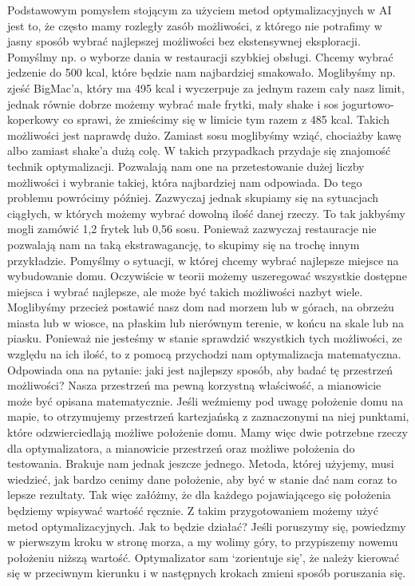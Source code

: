 Podstawowym pomysłem stojącym za użyciem metod optymalizacyjnych w AI jest to, że często mamy rozległy zasób możliwości, z którego nie potrafimy w jasny sposób wybrać najlepszej możliwości bez ekstensywnej eksploracji. Pomyślmy np. o wyborze dania w restauracji szybkiej obsługi. Chcemy wybrać jedzenie do 500 kcal, które będzie nam najbardziej smakowało. Moglibyśmy np. zjeść BigMac’a, który ma 495 kcal i wyczerpuje za jednym razem cały nasz limit, jednak równie dobrze możemy wybrać małe frytki, mały shake i sos jogurtowo-koperkowy co sprawi, że zmieścimy się w limicie tym razem z 485 kcal. Takich możliwości jest naprawdę dużo. Zamiast sosu moglibyśmy wziąć, chociażby kawę albo zamiast shake’a dużą colę. W takich przypadkach przydaje się znajomość technik optymalizacji. Pozwalają nam one na przetestowanie dużej liczby możliwości i wybranie takiej, która najbardziej nam odpowiada. Do tego problemu powrócimy później. Zazwyczaj jednak skupiamy się na sytuacjach ciągłych, w których możemy wybrać dowolną ilość danej rzeczy. To tak jakbyśmy mogli zamówić 1,2 frytek lub 0,56 sosu. Ponieważ zazwyczaj restauracje nie pozwalają nam na taką ekstrawagancję, to skupimy się na trochę innym przykładzie. Pomyślmy o sytuacji, w której chcemy wybrać najlepsze miejsce na wybudowanie domu. Oczywiście w teorii możemy uszeregować wszystkie dostępne miejsca i wybrać najlepsze, ale może być takich możliwości nazbyt wiele. Moglibyśmy przecież postawić nasz dom nad morzem lub w górach, na obrzeżu miasta lub w wiosce, na płaskim lub nierównym terenie, w końcu na skale lub na piasku. Ponieważ nie jesteśmy w stanie sprawdzić wszystkich tych możliwości, ze względu na ich ilość, to z pomocą przychodzi nam optymalizacja matematyczna. Odpowiada ona na pytanie: jaki jest najlepszy sposób, aby badać tę przestrzeń możliwości? Nasza przestrzeń ma pewną korzystną właściwość, a mianowicie może być opisana matematycznie. Jeśli weźmiemy pod uwagę położenie domu na mapie, to otrzymujemy przestrzeń kartezjańską z zaznaczonymi na niej punktami, które odzwierciedlają możliwe położenie domu. Mamy więc dwie potrzebne rzeczy dla optymalizatora, a mianowicie przestrzeń oraz możliwe położenia do testowania. Brakuje nam jednak jeszcze jednego. Metoda, której użyjemy, musi wiedzieć, jak bardzo cenimy dane położenie, aby być w stanie dać nam coraz to lepsze rezultaty. Tak więc załóżmy, że dla każdego pojawiającego się położenia będziemy wpisywać wartość ręcznie. Z takim przygotowaniem możemy użyć metod optymalizacyjnych. Jak to będzie działać? Jeśli poruszymy się, powiedzmy w pierwszym kroku w stronę morza, a my wolimy góry, to przypiszemy nowemu położeniu niższą wartość. Optymalizator sam ‘zorientuje się', że należy kierować się w przeciwnym kierunku i w następnych krokach zmieni sposób poruszania się.

